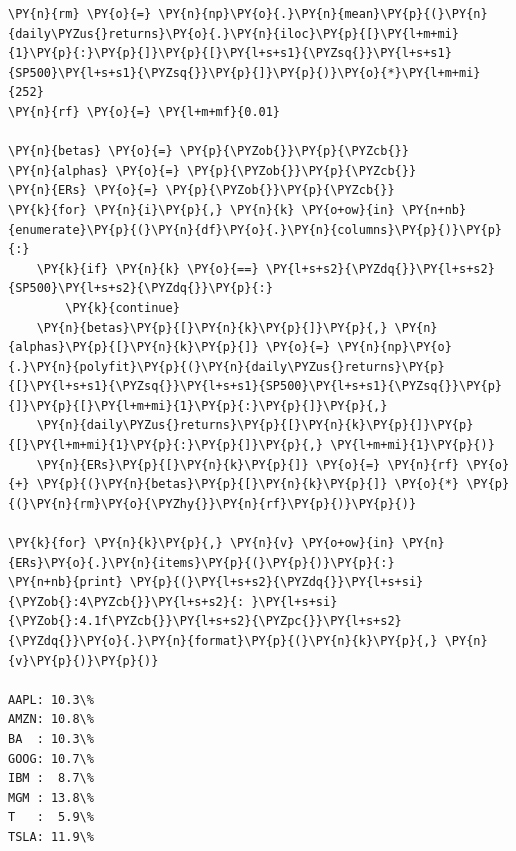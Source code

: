 \begin{tcolorbox}[breakable, size=fbox, boxrule=1pt, pad at break*=1mm,colback=cellbackground, colframe=cellborder]
\begin{Verbatim}[commandchars=\\\{\}]
\PY{n}{rm} \PY{o}{=} \PY{n}{np}\PY{o}{.}\PY{n}{mean}\PY{p}{(}\PY{n}{daily\PYZus{}returns}\PY{o}{.}\PY{n}{iloc}\PY{p}{[}\PY{l+m+mi}{1}\PY{p}{:}\PY{p}{]}\PY{p}{[}\PY{l+s+s1}{\PYZsq{}}\PY{l+s+s1}{SP500}\PY{l+s+s1}{\PYZsq{}}\PY{p}{]}\PY{p}{)}\PY{o}{*}\PY{l+m+mi}{252}
\PY{n}{rf} \PY{o}{=} \PY{l+m+mf}{0.01} 
	
\PY{n}{betas} \PY{o}{=} \PY{p}{\PYZob{}}\PY{p}{\PYZcb{}}
\PY{n}{alphas} \PY{o}{=} \PY{p}{\PYZob{}}\PY{p}{\PYZcb{}}
\PY{n}{ERs} \PY{o}{=} \PY{p}{\PYZob{}}\PY{p}{\PYZcb{}}
\PY{k}{for} \PY{n}{i}\PY{p}{,} \PY{n}{k} \PY{o+ow}{in} \PY{n+nb}{enumerate}\PY{p}{(}\PY{n}{df}\PY{o}{.}\PY{n}{columns}\PY{p}{)}\PY{p}{:}
    \PY{k}{if} \PY{n}{k} \PY{o}{==} \PY{l+s+s2}{\PYZdq{}}\PY{l+s+s2}{SP500}\PY{l+s+s2}{\PYZdq{}}\PY{p}{:}
        \PY{k}{continue}
    \PY{n}{betas}\PY{p}{[}\PY{n}{k}\PY{p}{]}\PY{p}{,} \PY{n}{alphas}\PY{p}{[}\PY{n}{k}\PY{p}{]} \PY{o}{=} \PY{n}{np}\PY{o}{.}\PY{n}{polyfit}\PY{p}{(}\PY{n}{daily\PYZus{}returns}\PY{p}{[}\PY{l+s+s1}{\PYZsq{}}\PY{l+s+s1}{SP500}\PY{l+s+s1}{\PYZsq{}}\PY{p}{]}\PY{p}{[}\PY{l+m+mi}{1}\PY{p}{:}\PY{p}{]}\PY{p}{,} 
    \PY{n}{daily\PYZus{}returns}\PY{p}{[}\PY{n}{k}\PY{p}{]}\PY{p}{[}\PY{l+m+mi}{1}\PY{p}{:}\PY{p}{]}\PY{p}{,} \PY{l+m+mi}{1}\PY{p}{)}
    \PY{n}{ERs}\PY{p}{[}\PY{n}{k}\PY{p}{]} \PY{o}{=} \PY{n}{rf} \PY{o}{+} \PY{p}{(}\PY{n}{betas}\PY{p}{[}\PY{n}{k}\PY{p}{]} \PY{o}{*} \PY{p}{(}\PY{n}{rm}\PY{o}{\PYZhy{}}\PY{n}{rf}\PY{p}{)}\PY{p}{)} 

\PY{k}{for} \PY{n}{k}\PY{p}{,} \PY{n}{v} \PY{o+ow}{in} \PY{n}{ERs}\PY{o}{.}\PY{n}{items}\PY{p}{(}\PY{p}{)}\PY{p}{:} 
\PY{n+nb}{print} \PY{p}{(}\PY{l+s+s2}{\PYZdq{}}\PY{l+s+si}{\PYZob{}:4\PYZcb{}}\PY{l+s+s2}{: }\PY{l+s+si}{\PYZob{}:4.1f\PYZcb{}}\PY{l+s+s2}{\PYZpc{}}\PY{l+s+s2}{\PYZdq{}}\PY{o}{.}\PY{n}{format}\PY{p}{(}\PY{n}{k}\PY{p}{,} \PY{n}{v}\PY{p}{)}\PY{p}{)}

AAPL: 10.3\%
AMZN: 10.8\%
BA  : 10.3\%
GOOG: 10.7\%
IBM :  8.7\%
MGM : 13.8\%
T   :  5.9\%
TSLA: 11.9\%
\end{Verbatim}
\end{tcolorbox}

